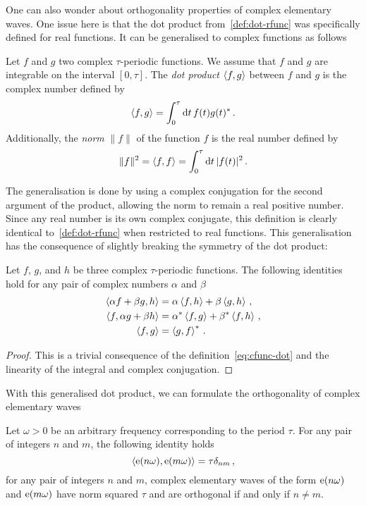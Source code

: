 One can also wonder about orthogonality properties of complex elementary waves. One issue
here is that the dot product from~\cref{def:dot-rfunc} was specifically defined for real
functions. It can be generalised to complex functions as follows
\begin{definition}
  Let $f$ and $g$ two complex $\tau$-periodic functions. We assume that $f$ and $g$ are
  integrable on the interval $[0,\tau]$. The \emph{dot product} $\braket{f,g}$ between $f$
  and $g$ is the complex number defined by
  \begin{equation}
    \braket{f,g}=\int_{0}^{\tau}\mathrm{d} t\, f(t)g(t)^*\,.\label{eq:cfunc-dot}
  \end{equation}
  Additionally, the \emph{norm} $\|f\|$ of the function $f$ is the real number defined by
  \begin{equation}
    \|f\|^2=\braket{f,f}=\int_{0}^{\tau}\mathrm{d} t\, |f(t)|^2\,.
  \end{equation}
\end{definition}
The generalisation is done by using a complex conjugation for the second argument of the
product, allowing the norm to remain a real positive number. Since any real number is its
own complex conjugate, this definition is clearly identical to~\cref{def:dot-rfunc} when
restricted to real functions. This generalisation has the consequence of slightly breaking
the symmetry of the dot product:
\begin{proposition}
  Let $f$, $g$, and $h$ be three complex $\tau$-periodic functions. The following
  identities hold for any pair of complex numbers $\alpha$ and $\beta$
  \begin{align}
    \braket{\alpha f+\beta g,h}&=\alpha\braket{f,h}+\beta\braket{g,h}\,,\\
    \braket{f,\alpha g+\beta h}&=\alpha^*\braket{f,g}+\beta^*\braket{f,h}\,,\\
    \braket{f,g}&=\braket{g,f}^*\,.
  \end{align}
\end{proposition}
\begin{proof}
  This is a trivial consequence of the definition~\cref{eq:cfunc-dot} and the linearity of
  the integral and complex conjugation.
\end{proof}
With this generalised dot product, we can formulate the orthogonality of complex
elementary waves
\begin{theorem}
  Let $\omega>0$ be an arbitrary frequency corresponding to the period $\tau$. For any
  pair of integers $n$ and $m$, the following identity holds
  \begin{equation}
    \braket{\operatorname{e}(n\omega),\operatorname{e}(m\omega)}=\tau\delta_{nm}\,,
  \end{equation}
  \ie for any pair of integers $n$ and $m$, complex elementary waves of the form
  $\operatorname{e}(n\omega)$ and $\operatorname{e}(m\omega)$ have norm squared $\tau$ and are orthogonal if and
  only if $n\neq m$.
\end{theorem}
